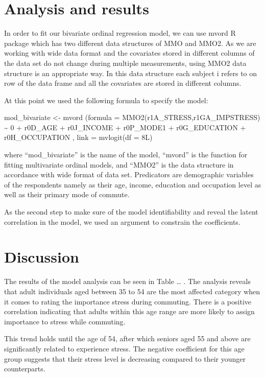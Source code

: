 \documentclass[
11pt, %
oneside, %
english, %
singlespacing, %
]{macthesis} %
\begin{document}
\hypertarget{analysis-and-results}{%
\section{Analysis and results}\label{analysis-and-results}}

In order to fit our bivariate ordinal regression model, we can use mvord R package which has two different data structures of MMO and MMO2. As we are working with wide data format and the covariates stored in different columns of the data set do not change during multiple measurements, using MMO2 data structure is an appropriate way. In this data structure each subject i refers to on row of the data frame and all the covariates are stored in different columns.

At this point we used the following formula to specify the model:

mod\_bivariate \textless- mvord (formula = MMO2(r1A\_STRESS,r1GA\_IMPSTRESS) \textasciitilde{} 0 + r0D\_AGE + r0J\_INCOME + r0P\_MODE1 + r0G\_EDUCATION + r0H\_OCCUPATION ,
link = mvlogit(df = 8L)

where ``mod\_bivariate'' is the name of the model, ``mvord'' is the function for fitting multivariate ordinal models, and ``MMO2'' is the data structure in accordance with wide format of data set. Predicators are demographic variables of the respondents namely as their age, income, education and occupation level as well as their primary mode of commute.

As the second step to make sure of the model identifiability and reveal the latent correlation in the model, we used an argument to constrain the coefficients.

\hypertarget{discussion}{%
\section{Discussion}\label{discussion}}

The results of the model analysis can be seen in Table \ldots{} . The analysis reveals that adult individuals aged between 35 to 54 are the most affected category when it comes to rating the importance stress during commuting. There is a positive correlation indicating that adults within this age range are more likely to assign importance to stress while commuting.

This trend holds until the age of 54, after which seniors aged 55 and above are significantly related to experience stress. The negative coefficient for this age group suggests that their stress level is decreasing compared to their younger counterparts.
\end{document}

